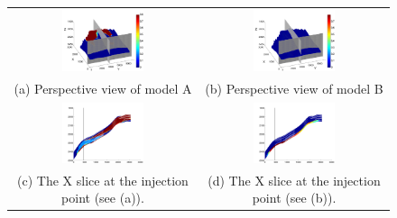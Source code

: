 \begin{figure}
\begin{tabular}{cc}
\includegraphics[width=0.45\textwidth]{./figurer/C02222_CO2atEOI_pers}&
\includegraphics[width=0.45\textwidth]{./figurer/C03211_CO2atEOI_pers}
\\(a) Perspective view of model A&(b) Perspective view of model B\\
\includegraphics[width=0.45\textwidth]{./figurer/C02222_CO2atEOI_slcx}&
\includegraphics[width=0.45\textwidth]{./figurer/C03211_CO2atEOI_slcx}
\\(c) The X slice at the injection point (see (a)).&
(d) The X slice at the injection point (see (b)).\\

\end{tabular}
\end{figure}
